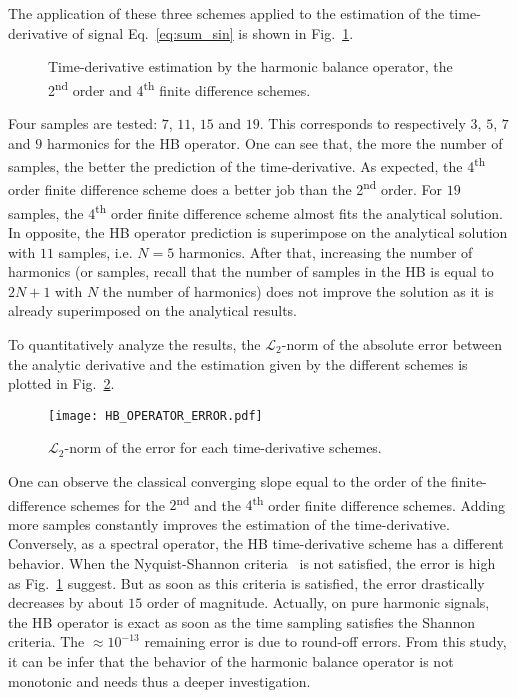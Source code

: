 The application of these three schemes applied 
to the estimation of the time-derivative of signal Eq.~\eqref{eq:sum_sin}
is shown
in Fig.~\ref{fig:hb_operator_sample}.
\begin{figure}[htbp]
  \centering
  \caption{Time-derivative estimation by the harmonic balance operator,
  the 2\textsuperscript{nd} order and 4\textsuperscript{th} finite difference schemes.}
  \label{fig:hb_operator_sample}
\end{figure}
Four samples
are tested: $7$, $11$, $15$ and $19$. This corresponds
to respectively $3$, $5$, $7$ and $9$ harmonics
for the HB operator. One can see that, the more the number
of samples, the better the prediction of the time-derivative.
As expected, the 4\textsuperscript{th} order finite difference
scheme does a better job than the 2\textsuperscript{nd} order.
For $19$ samples, the 4\textsuperscript{th} order finite difference
scheme almost fits the analytical solution. In opposite,
the HB operator prediction is superimpose on the analytical solution
with $11$ samples, i.e. $N=5$ harmonics. After that, increasing the
number of harmonics (or samples, recall that the number of samples
in the HB is equal to $2N+1$ with $N$ the number of harmonics)
does not improve the solution as it is already superimposed on
the analytical results.

To quantitatively analyze the results, the 
$\mathcal{L}_2$-norm of the absolute error between the analytic
derivative and the estimation given by the different schemes
is plotted in Fig.~\ref{fig:hb_operator_error}.
\begin{figure}[htb]
  \centering
   \texttt{[image: HB\_OPERATOR\_ERROR.pdf]}
   \caption{$\mathcal{L}_2$-norm of the error for each time-derivative
   schemes.}
  \label{fig:hb_operator_error}
\end{figure}
One can observe the classical converging slope
equal to the order of the finite-difference schemes for the
$2$\textsuperscript{nd} and the $4$\textsuperscript{th}
order finite difference schemes. 
Adding more samples constantly improves the estimation of 
the time-derivative.
Conversely, as a spectral operator, the HB time-derivative scheme 
has a different behavior. When the Nyquist-Shannon 
criteria~\cite{Nyquist1928, Shannon1949} is not
satisfied, the error is high as Fig.~\ref{fig:hb_operator_sample}
suggest. But as soon as this criteria is satisfied, the error
drastically decreases by about $15$ order of magnitude.
Actually, on pure
harmonic signals, the HB operator is exact as soon as the time
sampling satisfies the Shannon criteria. The $\approx 10^{-13}$
remaining error is due to round-off errors.
From this study, it can be infer that the behavior
of the harmonic balance operator is not monotonic
and needs thus a deeper investigation.